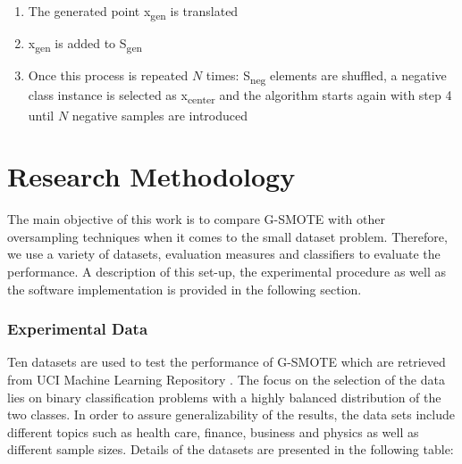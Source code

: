 \documentclass[parskip=full]{scrartcl}
\begin{document}
\begin{enumerate}
	\item 
	The generated point x\textsubscript{gen} is translated
	\item 
	x\textsubscript{gen} is added to S\textsubscript{gen}
	\item 
	Once this process is repeated $\mathit{N}$ times: S\textsubscript{neg} elements are shuffled, a negative class instance is selected as x\textsubscript{center} and the algorithm starts again with step 4 until $\mathit{N}$ negative samples are introduced
\end{enumerate}

\section{Research Methodology}

The main objective of this work is to compare G-SMOTE with other oversampling techniques when it comes to the small dataset problem. Therefore, we use a variety of datasets, evaluation measures and classifiers to evaluate the performance. A description of this set-up, the experimental procedure as well as the software implementation is provided in the following section.

\subsubsection{Experimental Data}

Ten datasets are used to test the performance of G-SMOTE which are retrieved from UCI Machine Learning Repository \cite{Dua.2019}. The focus on the selection of the data lies on binary classification problems with a highly balanced distribution of the two classes. In order to assure generalizability of the results, the data sets include different topics such as health care, finance, business and physics as well as different sample sizes. Details of the datasets are presented in the following table:
\end{document}

